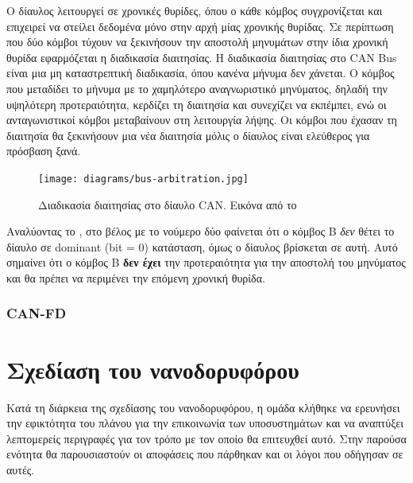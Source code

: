 \documentclass[a4paper,nobib,justified]{tufte-book}
\begin{document}
Ο δίαυλος λειτουργεί σε χρονικές θυρίδες, όπου ο κάθε κόμβος συγχρονίζεται και επιχειρεί να στείλει δεδομένα μόνο στην αρχή μίας χρονικής θυρίδας. Σε περίπτωση που δύο κόμβοι τύχουν να ξεκινήσουν την αποστολή μηνυμάτων στην ίδια χρονική θυρίδα εφαρμόζεται η διαδικασία διαιτησίας. Η διαδικασία διαιτησίας στο CAN Bus είναι μια μη καταστρεπτική διαδικασία, όπου κανένα μήνυμα δεν χάνεται. Ο κόμβος που μεταδίδει το μήνυμα με το χαμηλότερο αναγνωριστικό μηνύματος, δηλαδή την υψηλότερη προτεραιότητα, κερδίζει τη διαιτησία και συνεχίζει να εκπέμπει, ενώ οι ανταγωνιστικοί κόμβοι μεταβαίνουν στη λειτουργία λήψης. Οι κόμβοι που έχασαν τη διαιτησία θα ξεκινήσουν μια νέα διαιτησία μόλις ο δίαυλος είναι ελεύθερος για πρόσβαση ξανά.

\begin{figure}
	\centering
	\texttt{[image: diagrams/bus-arbitration.jpg]}
	\label{fig:arbitration}
	\caption[Διαδικασία διαιτησίας στο δίαυλο CAN]{Διαδικασία διαιτησίας στο δίαυλο CAN. Εικόνα από το \cite{comprehensibleguidetocan}}
\end{figure}

\FloatBarrier

Αναλύοντας το , στο βέλος με το νούμερο δύο φαίνεται ότι ο κόμβος B \emph{δεν} θέτει το δίαυλο σε dominant (bit = 0) κατάσταση, όμως ο δίαυλος βρίσκεται σε αυτή. Αυτό σημαίνει ότι ο κόμβος B \textbf{δεν έχει} την προτεραιότητα για την αποστολή του μηνύματος και θα πρέπει να περιμένει την επόμενη χρονική θυρίδα.

\subsection{CAN-FD}

\chapter{Σχεδίαση του νανοδορυφόρου}
\label{chap:design-choices}
Κατά τη διάρκεια της σχεδίασης του νανοδορυφόρου, η ομάδα κλήθηκε να ερευνήσει την εφικτότητα του πλάνου για την επικοινωνία των υποσυστημάτων και να αναπτύξει λεπτομερείς περιγραφές για τον τρόπο με τον οποίο θα επιτευχθεί αυτό. Στην παρούσα ενότητα θα παρουσιαστούν οι αποφάσεις που πάρθηκαν και οι λόγοι που οδήγησαν σε αυτές.
\end{document}
